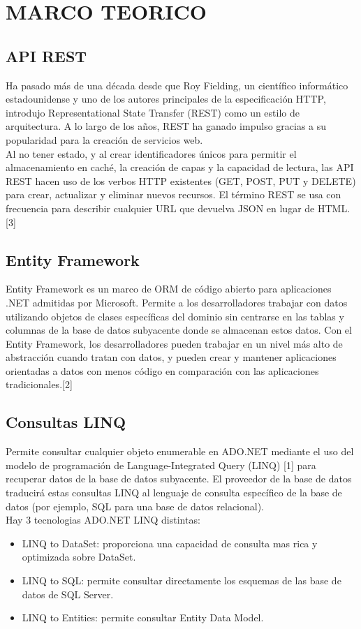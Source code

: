 \section{MARCO TEORICO} 

\par 

\subsection{API REST}
	\par Ha pasado más de una década desde que Roy Fielding, un científico informático estadounidense y uno de los autores principales de la especificación HTTP, introdujo Representational State Transfer (REST) como un estilo de arquitectura. A lo largo de los años, REST ha ganado impulso gracias a su popularidad para la creación de servicios web.\\
Al no tener estado, y al crear identificadores únicos para permitir el almacenamiento en caché, la creación de capas y la capacidad de lectura, las API REST hacen uso de los verbos HTTP existentes (GET, POST, PUT y DELETE) para crear, actualizar y eliminar nuevos recursos. El término REST se usa con frecuencia para describir cualquier URL que devuelva JSON en lugar de HTML.[3]
\subsection{Entity Framework}
	\par Entity Framework es un marco de ORM de código abierto para aplicaciones .NET admitidas por Microsoft. Permite a los desarrolladores trabajar con datos utilizando objetos de clases específicas del dominio sin centrarse en las tablas y columnas de la base de datos subyacente donde se almacenan estos datos. Con el Entity Framework, los desarrolladores pueden trabajar en un nivel más alto de abstracción cuando tratan con datos, y pueden crear y mantener aplicaciones orientadas a datos con menos código en comparación con las aplicaciones tradicionales.[2]\\

\subsection{ Consultas LINQ}
	\par Permite consultar cualquier objeto  enumerable en ADO.NET mediante el uso del modelo de programación de Language-Integrated Query (LINQ) [1] para recuperar datos de la base de datos subyacente. El proveedor de la base de datos traducirá estas consultas LINQ al lenguaje de consulta específico de la base de datos (por ejemplo, SQL para una base de datos relacional).\\
Hay 3 tecnologias ADO.NET LINQ distintas:
\begin{itemize}
	\item LINQ to DataSet: proporciona una capacidad de consulta mas rica y optimizada sobre DataSet.
	\item LINQ to SQL: permite consultar directamente los esquemas de las base de datos de SQL Server.
	\item LINQ to Entities: permite consultar Entity Data Model.
\end{itemize}

